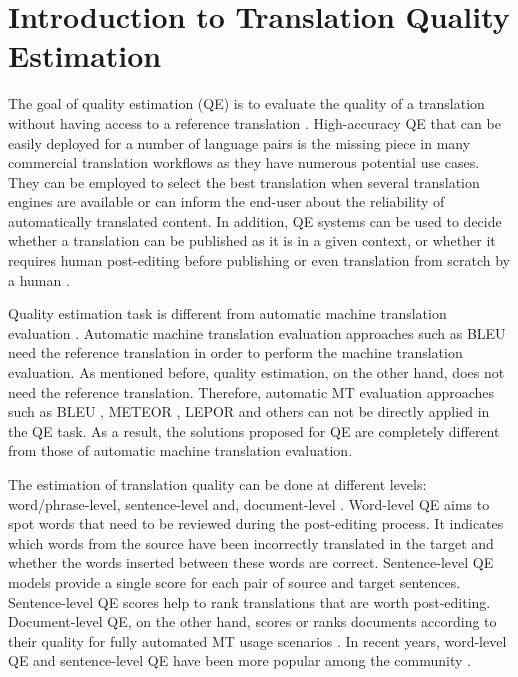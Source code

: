 
\DeclareRobustCommand{\hlgreen}[1]{{\sethlcolor{asparagus}\hl{#1}}}

\DeclareRobustCommand{\hlred}[1]{{\sethlcolor{brickred}\hl{#1}}}

\newcommand{\hlc}[2][yellow]{{%
		\colorlet{foo}{#1}%
		\sethlcolor{foo}\hl{#2}}%
}


\chapter{\label{cha:qe_introduction}Introduction to Translation Quality Estimation}

The goal of quality estimation (QE) is to evaluate the quality of a translation without having access to a reference translation \autocite{specia-etal-2018-findings}. High-accuracy QE that can be easily deployed for a number of language pairs is the missing piece in many commercial translation workflows as they have numerous potential use cases. They can be employed to select the best translation when several translation engines are available or can inform the end-user about the reliability of automatically translated content. In addition, QE systems can be used to decide whether a translation can be published as it is in a given context, or whether it requires human post-editing before publishing or even translation from scratch by a human  \autocite{kepler-etal-2019-openkiwi}. 

Quality estimation task is different from automatic machine translation evaluation \autocite{barrault-etal-2020-findings}. Automatic machine translation evaluation approaches such as BLEU \autocite{papineni-etal-2002-bleu} need the reference translation in order to perform the machine translation evaluation. As mentioned before, quality estimation, on the other hand, does not need the reference translation. Therefore, automatic MT evaluation approaches such as BLEU \autocite{papineni-etal-2002-bleu}, METEOR \autocite{banerjee-lavie-2005-meteor}, LEPOR \autocite{han-etal-2012-lepor} and others can not be directly applied in the QE task. As a result, the solutions proposed for QE are completely different from those of automatic machine translation evaluation.

The estimation of translation quality can be done at different levels: word/phrase-level, sentence-level and, document-level \autocite{ive-etal-2018-deepquest}. Word-level QE aims to spot words that need to be reviewed during the post-editing process. It indicates which words from the source have been incorrectly translated in the target and whether the words inserted between these words are correct. Sentence-level QE models provide a single score for each pair of source and target sentences. Sentence-level QE scores help to rank translations that are worth post-editing. Document-level QE, on the other hand, scores or ranks documents according to their quality for fully automated MT usage scenarios \autocite{ive-etal-2018-deepquest}. In recent years, word-level QE and sentence-level QE have been more popular among the community \autocite{specia-etal-2018-findings}.

